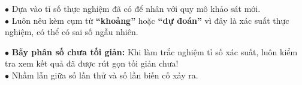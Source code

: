 \documentclass[14pt,a4paper,oneside]{extbook}
\begin{document}
\noindent
\begin{minipage}[t]{0.54\textwidth}
  \begin{tcolorbox}[
    enhanced,
    title={\footnotesize\bfseries\color{white}\faLineChart\ Kỹ năng dự đoán xu thế số liệu},
    colback=green!3!white,
    colframe=green!60!black,
    arc=2.5mm, boxrule=0.8pt, top=1.8mm, bottom=1.8mm, left=2.2mm, right=2.2mm
  ]
    \footnotesize
    $\bullet$ Dựa vào tỉ số thực nghiệm đã có để nhân với quy mô khảo sát mới.\\
    $\bullet$ Luôn nêu kèm cụm từ \textbf{``khoảng''} hoặc \textbf{``dự đoán''} vì đây là xác suất thực nghiệm, có thể có sai số ngẫu nhiên.
  \end{tcolorbox}
\end{minipage}%
\hfill
\begin{minipage}[t]{0.44\textwidth}
  \begin{tcolorbox}[
    enhanced,
    title={\footnotesize\bfseries\color{white}\faExclamationTriangle\ Mẹo tránh bẫy trắc nghiệm},
    colback=red!2!white,
    colframe=red!70!black,
    arc=2.5mm, boxrule=0.8pt, top=1.8mm, bottom=1.8mm, left=2.2mm, right=2.2mm
  ]
    \footnotesize
    $\bullet$ \textbf{Bẫy phân số chưa tối giản:} Khi làm trắc nghiệm tỉ số xác suất, luôn kiểm tra xem kết quả đã được rút gọn tối giản chưa!\\
    $\bullet$ Nhầm lẫn giữa số lần thử và số lần biến cố xảy ra.
  \end{tcolorbox}
\end{minipage}
\end{document}
